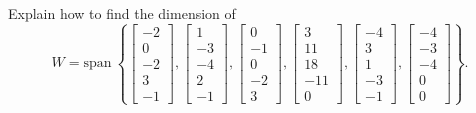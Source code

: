 \documentclass{article}
\begin{document}
\begin{exerciseStatement}
    Explain how to find the dimension of
\[W=\mathrm{span}\ \left\{\left[\begin{array}{r}
-2 \\
0 \\
-2 \\
3 \\
-1
\end{array}\right] , \left[\begin{array}{r}
1 \\
-3 \\
-4 \\
2 \\
-1
\end{array}\right] , \left[\begin{array}{r}
0 \\
-1 \\
0 \\
-2 \\
3
\end{array}\right] , \left[\begin{array}{r}
3 \\
11 \\
18 \\
-11 \\
0
\end{array}\right] , \left[\begin{array}{r}
-4 \\
3 \\
1 \\
-3 \\
-1
\end{array}\right] , \left[\begin{array}{r}
-4 \\
-3 \\
-4 \\
0 \\
0
\end{array}\right]\right\}.\]



  
\end{exerciseStatement}
\end{document}
